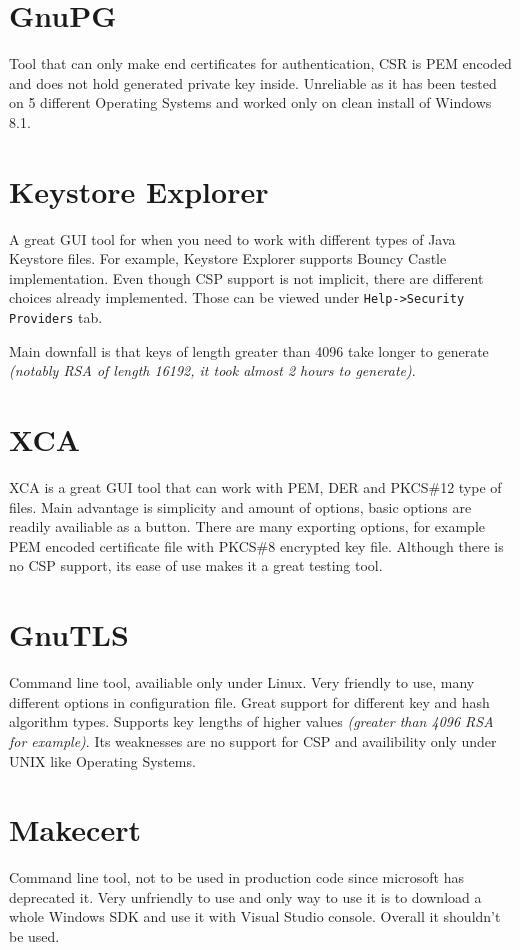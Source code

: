 \documentclass[10pt, a4paper]{report}
\begin{document}
\section{GnuPG}
Tool that can only make end certificates for authentication, CSR is PEM encoded and does not hold generated private key inside. Unreliable as it has been tested on 5 different Operating Systems and worked only on clean install of Windows 8.1.

\section{Keystore Explorer}
A great GUI tool for when you need to work with different types of Java Keystore files. For example, Keystore Explorer supports Bouncy Castle implementation. Even though CSP support is not implicit, there are different choices already implemented. Those can be viewed under \verb+Help->Security Providers+ tab.

Main downfall is that keys of length greater than 4096 take longer to generate \textit{(notably RSA of length 16192, it took almost 2 hours to generate)}.

\section{XCA}
XCA is a great GUI tool that can work with PEM, DER and PKCS\#12 type of files. Main advantage is simplicity and amount of options, basic options are readily availiable as a button. There are many exporting options, for example PEM encoded certificate file with PKCS\#8 encrypted key file. Although there is no CSP support, its ease of use makes it a great testing tool.

\section{GnuTLS}
Command line tool, availiable only under Linux. Very friendly to use, many different options in configuration file. Great support for different key and hash algorithm types. Supports key lengths of higher values \textit{(greater than 4096 RSA for example)}. Its weaknesses are no support for CSP and availibility only under UNIX like Operating Systems.

\section{Makecert}
Command line tool, not to be used in production code since microsoft has deprecated it. Very unfriendly to use and only way to use it is to download a whole Windows SDK and use it with Visual Studio console. Overall it shouldn't be used.
\end{document}

